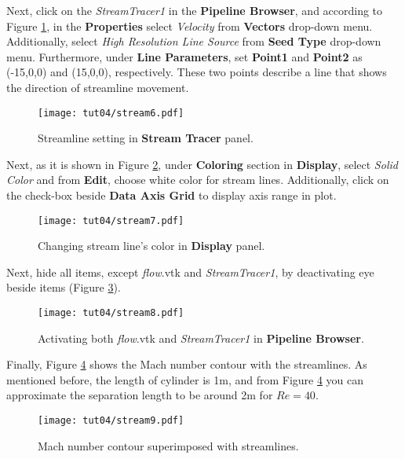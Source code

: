 Next, click on the \textit{StreamTracer1} in the \textbf{Pipeline Browser}, and according to Figure \ref{fig4:stream6_4}, in the \textbf{Properties} select \textit{Velocity} from \textbf{Vectors} drop-down menu. Additionally, select \textit{High Resolution Line Source} from \textbf{Seed Type} drop-down menu. Furthermore, under \textbf{Line Parameters}, set \textbf{Point1} and \textbf{Point2} as (-15,0,0) and (15,0,0), respectively. These two points describe a line that shows the direction of streamline movement.  
\begin{figure}[htbp]
    \centering
    \texttt{[image: tut04/stream6.pdf]}
    \caption{Streamline setting in \textbf{Stream Tracer} panel.}
    \label{fig4:stream6_4}
\end{figure}
Next, as it is shown in Figure \ref{fig4:stream7_4}, under \textbf{Coloring} section in \textbf{Display}, select \textit{Solid Color} and from \textbf{Edit}, choose white color for stream lines. Additionally, click on the check-box beside \textbf{Data Axis Grid} to display axis range in plot.
\begin{figure}[htbp]
    \centering
    \texttt{[image: tut04/stream7.pdf]}
    \caption{Changing stream line's color in \textbf{Display} panel.}
    \label{fig4:stream7_4}
\end{figure}
Next, hide all items, except \textit{flow}.vtk and \textit{StreamTracer1}, by deactivating eye beside items (Figure \ref{fig4:stream8_4}).
\begin{figure}[htbp]
    \centering
    \texttt{[image: tut04/stream8.pdf]}
    \caption{Activating both \textit{flow}.vtk and \textit{StreamTracer1} in \textbf{Pipeline Browser}.}
    \label{fig4:stream8_4}
\end{figure}
Finally, Figure \ref{fig4:stream9_4} shows the Mach number contour with the streamlines. As mentioned before, the length of cylinder is 1m, and from Figure \ref{fig4:stream9_4} you can approximate the separation length to be around 2m for $Re=40$.
\begin{figure}[htbp]
    \centering
    \texttt{[image: tut04/stream9.pdf]}
    \caption{Mach number contour superimposed with streamlines.}
    \label{fig4:stream9_4}
\end{figure}

